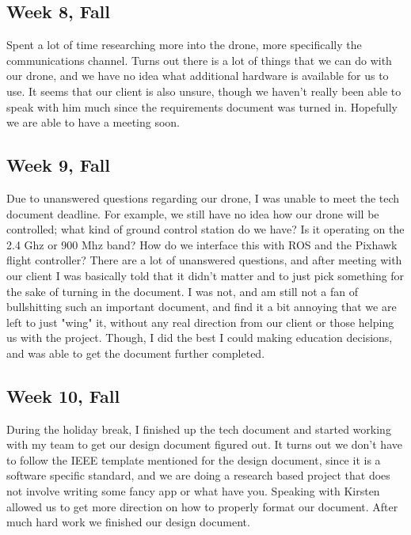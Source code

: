 \documentclass[IEEEtran,letterpaper,10pt,notitlepage,draftclsnofoot,onecolumn]{article}
\begin{document}
                            \subsection{Week 8, Fall}
                            Spent a lot of time researching more into the drone, more specifically the communications channel. Turns out there is a lot of things that we can do with our drone, and we have no idea what additional hardware is available for us to use. It seems that our client is also unsure, though we haven't really been able to speak with him much since the requirements document was turned in. Hopefully we are able to have a meeting soon.
                            \subsection{Week 9, Fall}
                            Due to unanswered questions regarding our drone, I was unable to meet the tech document deadline. For example, we still have no idea how our drone will be controlled; what kind of ground control station do we have? Is it operating on the 2.4 Ghz or 900 Mhz band? How do we interface this with ROS and the Pixhawk flight controller? There are a lot of unanswered questions, and after meeting with our client I was basically told that it didn't matter and to just pick something for the sake of turning in the document. I was not, and am still not a fan of bullshitting such an important document, and find it a bit annoying that we are left to just "wing" it, without any real direction from our client or those helping us with the project. Though, I did the best I could making education decisions, and was able to get the document further completed.
                            \subsection{Week 10, Fall}
                            During the holiday break, I finished up the tech document and started working with my team to get our design document figured out. It turns out we don't have to follow the IEEE template mentioned for the design document, since it is a software specific standard, and we are doing a research based project that does not involve writing some fancy app or what have you. Speaking with Kirsten allowed us to get more direction on how to properly format our document. After much hard work we finished our design document.
\end{document}
